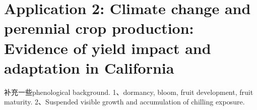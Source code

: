 \chapter{Application 2: Climate change and perennial crop production: Evidence of yield impact and adaptation in California}

\begin{card}
    补充一些phenological background.
    1、dormancy, bloom, fruit development, fruit maturity.
    2、Suspended visible growth and accumulation of chilling exposure.
\end{card}